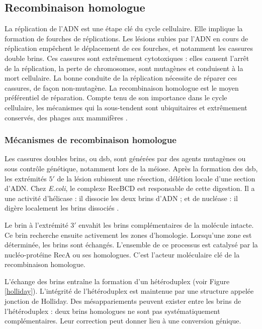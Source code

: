 \documentclass[11pt, oneside]{scrartcl}
\begin{document}
\subsection{Recombinaison homologue}
\label{sec:orgheadline5}

La réplication de l'ADN est une étape clé du cycle cellulaire. Elle implique la
formation de fourches de réplications. Les lésions subies par l'ADN en cours de
réplication empêchent le déplacement de ces fourches, et notamment les cassures
double brins. Ces cassures sont extrêmement cytotoxiques : elles causent l'arrêt
de la réplication, la perte de chromosomes, sont mutagènes et conduisent à la
mort cellulaire. La bonne conduite de la réplication nécessite de réparer ces
cassures, de façon non-mutagène. La recombinaison homologue est le moyen
préférentiel de réparation. Compte tenu de son importance dans le cycle
cellulaire, les mécanismes qui la sous-tendent sont ubiquitaires et extrêmement
conservés, des phages aux mammifères \cite{cromie_recombination_2001}.

\subsubsection{Mécanismes de recombinaison homologue}
\label{sec:orgheadline2}

Les cassures doubles brins, ou \ac{dsb}, sont générées par des agents
mutagènes ou sous contrôle génétique, notamment lors de la méiose. Après la
formation des \ac{dsb}, les extrémités \(5'\) de la lésion subissent une
résection, délétion locale d'une section d'ADN. Chez \emph{E.coli}, le complexe
RecBCD est responsable de cette digestion. Il a une activité d'hélicase : il
dissocie les deux brins d'ADN ; et de nucléase : il digère localement les brins
dissociés \cite{dillingham_recbcd_2008}.

Le brin à l'extrémité \(3'\) envahit les brins complémentaires de la molécule
intacte. Ce brin recherche ensuite activement les zones d'homologie. Lorsqu'une
zone est déterminée, les brins sont échangés. L'ensemble de ce processus est
catalysé par la nucléo-protéine RecA \cite{chen_mechanism_2008} ou ses
homologues. C'est l'acteur moléculaire clé de la recombinaison homologue.

L'échange des brins entraîne la formation d'un hétéroduplex (voir Figure
\ref{holliday}). L'intégrité de l'hétéroduplex est maintenue par une structure
appelée jonction de Holliday. Des mésappariements peuvent exister entre les
brins de l'hétéroduplex : deux brins homologues ne sont pas systématiquement
complémentaires. Leur correction peut donner lieu à une conversion génique.
\end{document}
